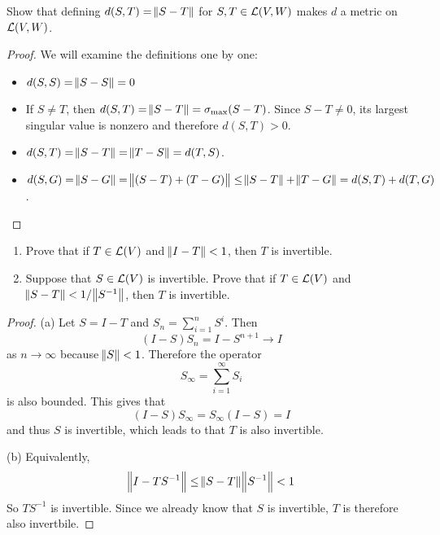\documentclass{extarticle}
\begin{document}
\begin{problem}{7}
    Show that defining \(d(S, T) = \norm{S - T}\) for 
    \(S, T \in \mathcal{L}(V, W)\) makes \(d\) a metric on 
    \(\mathcal{L}(V, W)\).  
\end{problem}

\begin{proof}
We will examine the definitions one by one:
\begin{itemize}
    \item \(d(S, S) = \norm{S - S} = 0\) 
    \item If \(S \neq T\), then \(d(S, T) 
    = \norm{S - T} = \sigma_{\max}(S - T) \). Since 
    \(S - T \neq 0\), its largest singular value is nonzero
    and therefore \(d(S, T) > 0\). 
    \item \(d(S, T) = \norm{S - T} = \norm{T - S} = 
    d(T, S)\).  
    \item \(d(S, G) = \norm{S - G} 
    = \norm{(S - T) + (T - G)} 
    \leq \norm{S - T} + \norm{T - G} 
    = d(S, T) + d(T, G)\). 
\end{itemize}
\end{proof}


\begin{problem}{8}
    \begin{enumerate}[label=(\alph*)]
        \item Prove that if \(T \in \mathcal{L}(V)\) and 
        \(\norm{I - T} < 1\), then \(T\) is invertible. 
        \item Suppose that \(S \in \mathcal{L}(V)\) is invertible.
        Prove that if \(T \in \mathcal{L}(V)\) and 
        \(\norm{S - T} < 1/\norm{S^{-1}}\), then 
        \(T\) is invertible. 
    \end{enumerate}
\end{problem}

\begin{proof}
(a) Let \(S = I - T\) and \(S_n = \sum_{i=1}^{n} S^{i}\).
Then 
\[(I - S)S_n = I - S^{n+1} \to I\]
as \(n \to \infty\) because \(\norm{S} < 1\). Therefore the operator 
\[S_\infty = \sum_{i=1}^{\infty} S_i\]
is also bounded. This gives that 
\[(I - S)S_{\infty} = S_{\infty} (I - S) = I\]
and thus \(S\) is invertible, which leads to that \(T\) is also invertible. 

(b) Equivalently, 
\[ \norm{I - TS^{-1}}  \leq \norm{S - T} \norm{S^{-1}} < 1\]
So \(TS^{-1}\) is invertible. Since we already know that 
\(S\) is invertible, \(T\) is therefore also invertbile. 
\end{proof}
\end{document}
